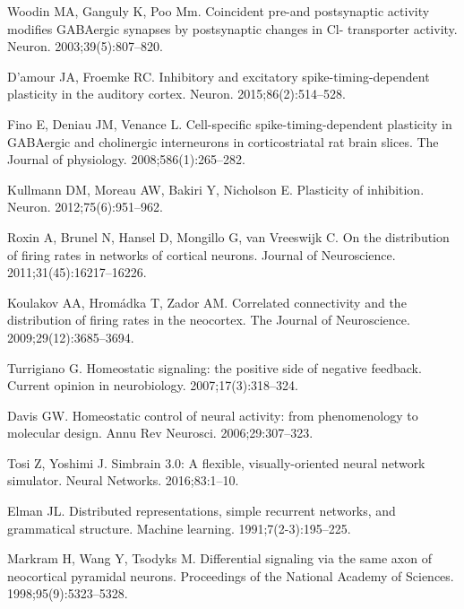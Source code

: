 \documentclass[10pt,letterpaper]{article}
\begin{document}
\begin{thebibliography}{10}
Woodin MA, Ganguly K, Poo Mm.
\newblock Coincident pre-and postsynaptic activity modifies GABAergic synapses
  by postsynaptic changes in Cl- transporter activity.
\newblock Neuron. 2003;39(5):807--820.

D’amour JA, Froemke RC.
\newblock Inhibitory and excitatory spike-timing-dependent plasticity in the
  auditory cortex.
\newblock Neuron. 2015;86(2):514--528.

Fino E, Deniau JM, Venance L.
\newblock Cell-specific spike-timing-dependent plasticity in GABAergic and
  cholinergic interneurons in corticostriatal rat brain slices.
\newblock The Journal of physiology. 2008;586(1):265--282.

Kullmann DM, Moreau AW, Bakiri Y, Nicholson E.
\newblock Plasticity of inhibition.
\newblock Neuron. 2012;75(6):951--962.

Roxin A, Brunel N, Hansel D, Mongillo G, van Vreeswijk C.
\newblock On the distribution of firing rates in networks of cortical neurons.
\newblock Journal of Neuroscience. 2011;31(45):16217--16226.

Koulakov AA, Hrom{\'a}dka T, Zador AM.
\newblock Correlated connectivity and the distribution of firing rates in the
  neocortex.
\newblock The Journal of Neuroscience. 2009;29(12):3685--3694.

Turrigiano G.
\newblock Homeostatic signaling: the positive side of negative feedback.
\newblock Current opinion in neurobiology. 2007;17(3):318--324.

Davis GW.
\newblock Homeostatic control of neural activity: from phenomenology to
  molecular design.
\newblock Annu Rev Neurosci. 2006;29:307--323.

Tosi Z, Yoshimi J.
\newblock Simbrain 3.0: A flexible, visually-oriented neural network simulator.
\newblock Neural Networks. 2016;83:1--10.

Elman JL.
\newblock Distributed representations, simple recurrent networks, and
  grammatical structure.
\newblock Machine learning. 1991;7(2-3):195--225.

Markram H, Wang Y, Tsodyks M.
\newblock Differential signaling via the same axon of neocortical pyramidal
  neurons.
\newblock Proceedings of the National Academy of Sciences.
  1998;95(9):5323--5328.


\end{thebibliography}
\end{document}
